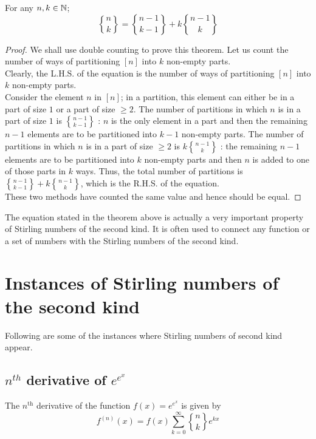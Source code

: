 \begin{theorem} For any $n,k \in \mathbb{N}$;
$${n \brace k} = {n-1 \brace k-1} + k {n-1 \brace k}$$
\end{theorem}
\begin{proof}
We shall use double counting to prove this theorem. Let us count the number of ways of partitioning $[n]$ into $k$ non-empty parts.\\ Clearly, the L.H.S. of the equation is the number of ways of partitioning $[n]$ into $k$ non-empty parts. \\
Consider the element $n$ in $[n]$; in a partition, this element can either be in a part of size $1$ or a part of size $\geq 2$. The number of partitions in which $n$ is in a part of size $1$ is ${n-1 \brace k-1}$ : $n$ is the only element in a part and then the remaining $n-1$ elements are to be partitioned into $k-1$ non-empty parts. The number of partitions in which $n$ is in a part of size $\geq 2$ is $k {n-1 \brace k}$ : the remaining $n-1$ elements are to be partitioned into $k$ non-empty parts and then $n$ is added to one of those parts in $k$ ways. Thus, the total number of partitions is ${n-1 \brace k-1} + k {n-1 \brace k}$, which is the R.H.S. of the equation.\\
These two methods have counted the same value and hence should be equal.
\end{proof}
\noindent
The equation stated in the theorem above is actually a very important property of Stirling numbers of the second kind. It is often used to connect any function or a set of numbers with the Stirling numbers of the second kind. \\
\section{Instances of Stirling numbers of the second kind}
Following are some of the instances where Stirling numbers of second kind appear.
\subsection{$n^{th}$ derivative of $e^{e^x}$} 
The $n^{\text{th}}$ derivative of the function $f(x) = e^{e^x}$ is given by
    $$f^{(n)}(x) = f(x) \sum_{k=0}^{\infty}{n \brace k} e^{kx}$$
